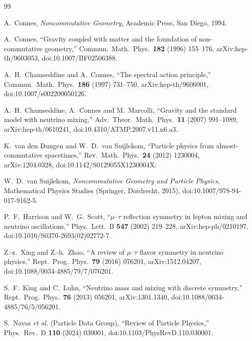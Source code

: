\documentclass[11pt,a4paper]{article}
\theoremstyle{definition}
\begin{document}
\begin{thebibliography}{99}

 A.\ Connes, \emph{Noncommutative Geometry},
Academic Press, San Diego, 1994.

 A.\ Connes, ``Gravity coupled with matter and the
foundation of non-commutative geometry,'' Commun.\ Math.\ Phys.\ \textbf{182}
(1996) 155--176, arXiv:hep-th/9603053, doi:10.1007/BF02506388.

 A.\ H.\ Chamseddine and A.\ Connes, ``The spectral action
principle,'' Commun.\ Math.\ Phys.\ \textbf{186} (1997) 731--750,
arXiv:hep-th/9606001, doi:10.1007/s002200050126.

 A.\ H.\ Chamseddine, A.\ Connes and M.\ Marcolli, ``Gravity and
the standard model with neutrino mixing,'' Adv.\ Theor.\ Math.\ Phys.\ \textbf{11}
(2007) 991--1089, arXiv:hep-th/0610241, doi:10.4310/ATMP.2007.v11.n6.a3.

 K.\ van den Dungen and W.\ D.\ van Suijlekom,
``Particle physics from almost-commutative spacetimes,'' Rev.\ Math.\ Phys.\
\textbf{24} (2012) 1230004, arXiv:1204.0328, doi:10.1142/S0129055X1230004X.

 W.\ D.\ van Suijlekom, \emph{Noncommutative Geometry
and Particle Physics}, Mathematical Physics Studies (Springer, Dordrecht, 2015),
doi:10.1007/978-94-017-9162-5.

 P.\ F.\ Harrison and W.\ G.\ Scott, ``$\mu$--$\tau$
reflection symmetry in lepton mixing and neutrino oscillations,'' Phys.\ Lett.\ B
\textbf{547} (2002) 219--228, arXiv:hep-ph/0210197,
doi:10.1016/S0370-2693(02)02772-7.

 Z.-z.\ Xing and Z.-h.\ Zhao, ``A review of $\mu$--$\tau$
flavor symmetry in neutrino physics,'' Rept.\ Prog.\ Phys.\ \textbf{79} (2016)
076201, arXiv:1512.04207, doi:10.1088/0034-4885/79/7/076201.

 S.\ F.\ King and C.\ Luhn, ``Neutrino mass and mixing with
discrete symmetry,'' Rept.\ Prog.\ Phys.\ \textbf{76} (2013) 056201,
arXiv:1301.1340, doi:10.1088/0034-4885/76/5/056201.

 S.\ Navas \textit{et al.} (Particle Data Group), ``Review of
Particle Physics,'' Phys.\ Rev.\ D \textbf{110} (2024) 030001,
doi:10.1103/PhysRevD.110.030001.


\end{thebibliography}
\end{document}

